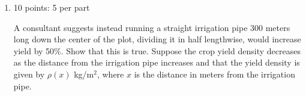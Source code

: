 \documentclass{article}
\begin{document}
\begin{enumerate}
\begin{enumerate}
    \begin{solution}
      Taking the limit as $n \to \infty$ of our Riemann sum, the exact
      yield from the plot is $\boxed{ \int_0^{200} 300 \rho(x)\,dx}$.
    \end{solution}

\pspace{\newpage}

  \item
    \begin{problem}[\vfill]
      If $\displaystyle \rho(x) = \frac{1000}{(x + 100)^2}$, evaluate your
      integral.  (You should get 2000 kg.) 
    \end{problem}

    \begin{solution}
      We're evaluating
      \begin{align*}
        \int_0^{200} 300 \cdot \frac{1000}{(x + 100)^2}\,dx 
        &= 300,000 \int_0^{200} \frac{1}{(x + 100)^2}\,dx \\
        \intertext{Let's substitute $u = x + 100$; then, $du = dx$.  As
          $x$ goes from $0$ to $200$, $u = x + 100$ goes from $0 + 100 =
          100$ to $200 + 100 = 300$:} %
        &= 300,000 \int_{100}^{300} \frac{1}{u^2}\,du \\
        &= 300,000 \int_{100}^{300} u^{-2}\,du \\
        &= 300,000 \left( - u^{-1} \right) \Big|_{100}^{300} \\
        &= 300,000 \left( - \frac{1}{300} + \frac{1}{100} \right) \\
        &= 2000,
      \end{align*}
      so the field yields 2000 kg of corn.
    \end{solution}

  \end{enumerate}

\item

\begin{grading}
    10 points: 5 per part
\end{grading}

A consultant suggests instead running a straight irrigation pipe $300$ meters
  long down the center of the plot, dividing it in half lengthwise,
  would increase yield by 50\%. Show that this is true. 
  Suppose the crop yield density decreases as the distance from the 
  irrigation pipe increases and that the yield density is given by 
  $\rho(x)$ kg/m$^2$, where $x$ is the distance in meters from the
  irrigation pipe.


\end{enumerate}
\end{document}
